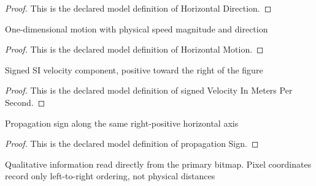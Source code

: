 \begin{proof}
  This is the declared model definition of Horizontal Direction.
\end{proof}
\begin{definition}
  \label{def:physics:phyx-mini-0327:phyxminiproblems-problemphyxmini0327-horizontalmotion}
  One-dimensional motion with physical speed magnitude and direction
\end{definition}
\begin{proof}
  This is the declared model definition of Horizontal Motion.
\end{proof}
\begin{definition}
  \label{def:physics:phyx-mini-0327:phyxminiproblems-problemphyxmini0327-signedvelocityinmeterspersecond}
  Signed SI velocity component, positive toward the right of the figure
\end{definition}
\begin{proof}
  This is the declared model definition of signed Velocity In Meters Per Second.
\end{proof}
\begin{definition}
  \label{def:physics:phyx-mini-0327:phyxminiproblems-problemphyxmini0327-propagationsign}
  Propagation sign along the same right-positive horizontal axis
\end{definition}
\begin{proof}
  This is the declared model definition of propagation Sign.
\end{proof}
\begin{definition}
  \label{def:physics:phyx-mini-0327:phyxminiproblems-problemphyxmini0327-echospeedfigure}
  Qualitative information read directly from the primary bitmap. Pixel coordinates record only left-to-right ordering, not physical distances
\end{definition}
